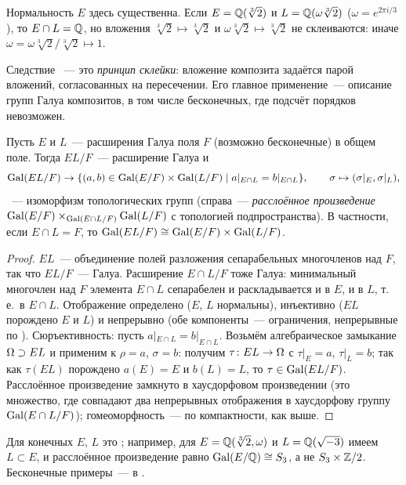 \begin{remark}[7.16a]
Нормальность $E$ здесь существенна. Если $E=\mathbb Q(\sqrt[3]2)$ и $L=\mathbb Q(\omega\sqrt[3]2)$ ($\omega=e^{2\pi i/3}$), то
$E\cap L=\mathbb Q$, но вложения $\sqrt[3]2\mapsto\sqrt[3]2$ и $\omega\sqrt[3]2\mapsto\sqrt[3]2$ не склеиваются: иначе
$\omega=\omega\sqrt[3]2/\sqrt[3]2\mapsto1$.
\end{remark}

Следствие ~--- это \emph{принцип склейки}: вложение композита задаётся парой вложений, согласованных на пересечении.
Его главное применение~--- описание групп Галуа композитов, в том числе бесконечных, где подсчёт порядков невозможен.

\begin{corollary}[7.16b]
Пусть $E$ и $L$~--- расширения Галуа поля $F$ (возможно бесконечные) в общем поле. Тогда $EL/F$~--- расширение Галуа и
\[
\operatorname{Gal}(EL/F)\to\{(a,b)\in\operatorname{Gal}(E/F)\times\operatorname{Gal}(L/F)\mid a|_{E\cap L}=b|_{E\cap L}\},\qquad\sigma\mapsto(\sigma|_E,\sigma|_L),
\]
~--- изоморфизм топологических групп (справа~--- \emph{расслоённое произведение} $\operatorname{Gal}(E/F)\times_{\operatorname{Gal}(E\cap L/F)}\operatorname{Gal}(L/F)$
с топологией подпространства). В частности, если $E\cap L=F$, то $\operatorname{Gal}(EL/F)\cong\operatorname{Gal}(E/F)\times\operatorname{Gal}(L/F)$.
\end{corollary}

\begin{proof}
$EL$~--- объединение полей разложения сепарабельных многочленов над $F$, так что $EL/F$~--- Галуа. Расширение
$E\cap L/F$ тоже Галуа: минимальный многочлен над $F$ элемента $E\cap L$ сепарабелен и раскладывается и в $E$, и в $L$,
т.\,е.\ в $E\cap L$. Отображение
определено ($E$, $L$ нормальны), инъективно ($EL$ порождено $E$ и $L$) и непрерывно (обе компоненты~--- ограничения,
непрерывные по ). Сюръективность: пусть $a|_{E\cap L}=b|_{E\cap L}$. Возьмём алгебраическое замыкание
$\Omega\supset EL$ и применим  к $\rho=a$, $\sigma=b$: получим $\tau\colon EL\to\Omega$ с $\tau|_E=a$, $\tau|_L=b$; так как
$\tau(EL)$ порождено $a(E)=E$ и $b(L)=L$, то $\tau\in\operatorname{Gal}(EL/F)$. Расслоённое произведение замкнуто в хаусдорфовом
произведении (это множество, где совпадают два непрерывных отображения в хаусдорфову группу $\operatorname{Gal}(E\cap L/F)$);
гомеоморфность~--- по компактности, как выше.
\end{proof}

Для конечных $E$, $L$ это ; например, для $E=\mathbb Q(\sqrt[3]2,\omega)$ и $L=\mathbb Q(\sqrt{-3})$ имеем $L\subset E$, и
расслоённое произведение равно $\operatorname{Gal}(E/\mathbb Q)\cong S_3$, а не $S_3\times\mathbb Z/2$. Бесконечные примеры~--- в .

